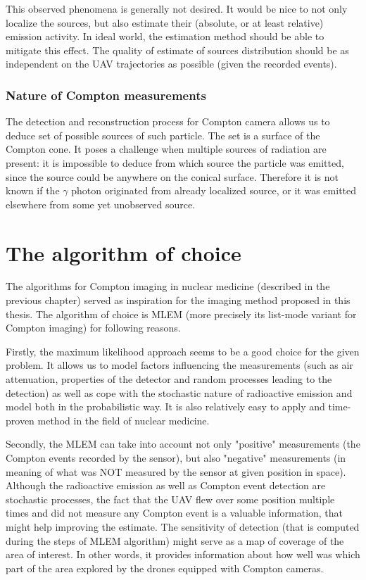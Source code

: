 {    This observed phenomena is generally not desired.
    It would be nice to not only localize the sources, but also estimate their (absolute, or at least relative) emission activity.
    In ideal world, the estimation method should be able to mitigate this effect.
    The quality of estimate of sources distribution should be as independent on the \ac{UAV} trajectories as possible (given the recorded events).

    \subsubsection{Nature of Compton measurements}
    The detection and reconstruction process for Compton camera allows us to deduce set of possible sources of such particle.
    The set is a surface of the Compton cone.
    It poses a challenge when multiple sources of radiation are present:
    it is impossible to deduce from which source the particle was emitted, since the source could be anywhere on the conical surface.
    Therefore it is not known if the $\gamma$ photon originated from already localized source, or it was emitted elsewhere from some yet unobserved source.
}%

\section{The algorithm of choice}
\label{sec:prelim}
The algorithms for Compton imaging in nuclear medicine (described in the previous chapter) served as inspiration for the imaging method proposed in this thesis.
The algorithm of choice is \ac{MLEM} (more precisely its list-mode variant for Compton imaging) for following reasons.

Firstly, the maximum likelihood approach seems to be a good choice for the given problem.
It allows us to model factors influencing the measurements (such as air attenuation, properties of the detector and random processes leading to the detection)
as well as cope with the stochastic nature of radioactive emission and model both in the probabilistic way.
It is also relatively easy to apply and time-proven method in the field of nuclear medicine.

Secondly, the \ac{MLEM} can take into account not only "positive" measurements (the Compton events recorded by the sensor), but also "negative" measurements (in meaning of what was NOT measured by the sensor at given position in space).
Although the radioactive emission as well as Compton event detection are stochastic processes, the fact that the \ac{UAV} flew over some position multiple times and did not measure any Compton event is a valuable information, that might help improving the estimate.
The sensitivity of detection (that is computed during the steps of \ac{MLEM} algorithm) might serve as a map of coverage of the area of interest.
In other words, it provides information about how well was which part of the area explored by the drones equipped with Compton cameras.

